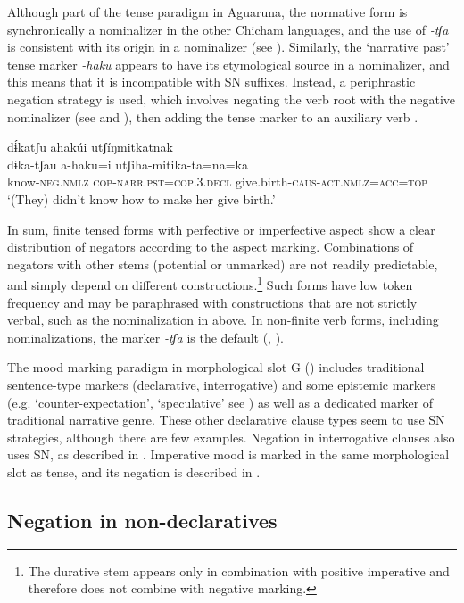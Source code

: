 \documentclass[output=paper,colorlinks,citecolor=brown,draft]{langscibook}
\begin{document}
Although part of the tense paradigm in Aguaruna, the normative form is synchronically a nominalizer in the other Chicham languages, and the use of \textit{{}-tʃa} is consistent with its origin in a nominalizer (see ). Similarly, the ‘narrative past’ tense marker \textit{{}-haku} appears to have its etymological source in a nominalizer, and this means that it is incompatible with SN suffixes. Instead, a periphrastic negation strategy is used, which involves negating the verb root with the negative nominalizer (see  and ), then adding the tense marker to an auxiliary verb .

\ea\label{ex:agu:9}
    \glll dɨ́katʃu ahakúi utʃíŋmitkatnak \\ 
          dɨka-tʃau  a-haku=i utʃiha-mitika-ta=na=ka\\
          know-\textsc{neg.nmlz}  \textsc{cop-narr.pst=cop.3.decl} give.birth-\textsc{caus-act.nmlz=acc=top} \\
    \glt ‘(They) didn’t know how to make her give birth.’ \citep[300]{Overall2017a}
\z 

In sum, finite tensed forms with perfective or imperfective aspect show a clear distribution of negators according to the aspect marking. Combinations of negators with other stems (potential or unmarked) are not readily predictable, and simply depend on different constructions.\footnote{The durative stem appears only in combination with positive imperative and therefore does not combine with negative marking.} Such forms have low token frequency and may be paraphrased with constructions that are not strictly verbal, such as the nominalization in  above. In non-finite verb forms, including nominalizations, the marker \textit{\nobreakdash-tʃa} is the default (, ).

The mood marking paradigm in morphological slot G () includes traditional sentence-type markers (declarative, interrogative) and some epistemic markers (e.g. ‘counter-expectation’, ‘speculative’ see ) as well as a dedicated marker of traditional narrative genre. These other declarative clause types seem to use SN strategies, although there are few examples. Negation in interrogative clauses also uses SN, as described in . Imperative mood is marked in the same morphological slot as tense, and its negation is described in .

\subsection{Negation in non-declaratives}\label{sec:agu:2.2}
\end{document}
